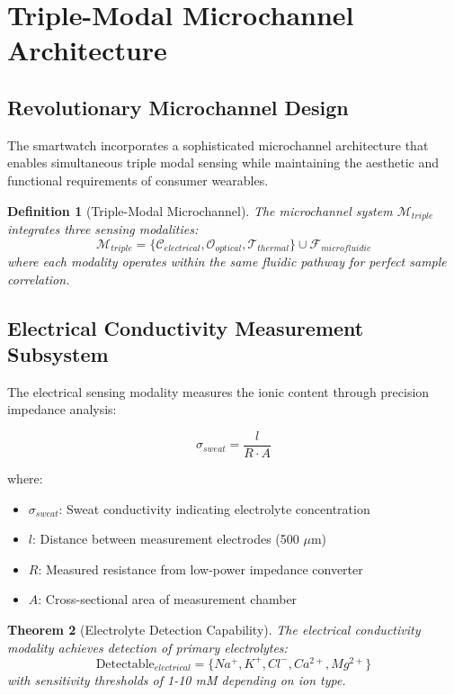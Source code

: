 \documentclass[12pt,a4paper]{article}
\newtheorem{theorem}{Theorem}[section]
\newtheorem{definition}[theorem]{Definition}
\begin{document}
\section{Triple-Modal Microchannel Architecture}

\subsection{Revolutionary Microchannel Design}

The smartwatch incorporates a sophisticated microchannel architecture that enables simultaneous triple modal sensing while maintaining the aesthetic and functional requirements of consumer wearables.

\begin{definition}[Triple-Modal Microchannel]
The microchannel system $\mathcal{M}_{triple}$ integrates three sensing modalities:
\begin{equation}
\mathcal{M}_{triple} = \{\mathcal{C}_{electrical}, \mathcal{O}_{optical}, \mathcal{T}_{thermal}\} \cup \mathcal{F}_{microfluidic}
\end{equation}
where each modality operates within the same fluidic pathway for perfect sample correlation.
\end{definition}

\subsection{Electrical Conductivity Measurement Subsystem}

The electrical sensing modality measures the ionic content through precision impedance analysis:

\begin{equation}
\sigma_{sweat} = \frac{l}{R \cdot A}
\end{equation}

where:
\begin{itemize}
\item $\sigma_{sweat}$: Sweat conductivity indicating electrolyte concentration
\item $l$: Distance between measurement electrodes (500 $\mu$m)
\item $R$: Measured resistance from low-power impedance converter
\item $A$: Cross-sectional area of measurement chamber
\end{itemize}

\begin{theorem}[Electrolyte Detection Capability]
The electrical conductivity modality achieves detection of primary electrolytes:
\begin{equation}
\text{Detectable}_{electrical} = \{Na^+, K^+, Cl^-, Ca^{2+}, Mg^{2+}\}
\end{equation}
with sensitivity thresholds of 1-10 mM depending on ion type.
\end{theorem}
\end{document}

